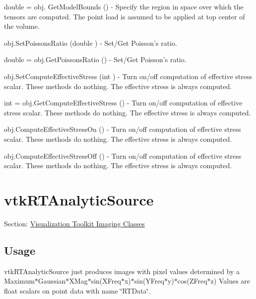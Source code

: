 \begin{DoxyItemize}
\item {\ttfamily double = obj. Get\-Model\-Bounds ()} -\/ Specify the region in space over which the tensors are computed. The point load is assumed to be applied at top center of the volume.  
\item {\ttfamily obj.\-Set\-Poissons\-Ratio (double )} -\/ Set/\-Get Poisson's ratio.  
\item {\ttfamily double = obj.\-Get\-Poissons\-Ratio ()} -\/ Set/\-Get Poisson's ratio.  
\item {\ttfamily obj.\-Set\-Compute\-Effective\-Stress (int )} -\/ Turn on/off computation of effective stress scalar. These methods do nothing. The effective stress is always computed.  
\item {\ttfamily int = obj.\-Get\-Compute\-Effective\-Stress ()} -\/ Turn on/off computation of effective stress scalar. These methods do nothing. The effective stress is always computed.  
\item {\ttfamily obj.\-Compute\-Effective\-Stress\-On ()} -\/ Turn on/off computation of effective stress scalar. These methods do nothing. The effective stress is always computed.  
\item {\ttfamily obj.\-Compute\-Effective\-Stress\-Off ()} -\/ Turn on/off computation of effective stress scalar. These methods do nothing. The effective stress is always computed.  
\end{DoxyItemize}\hypertarget{vtkimaging_vtkrtanalyticsource}{}\section{vtk\-R\-T\-Analytic\-Source}\label{vtkimaging_vtkrtanalyticsource}
Section\-: \hyperlink{sec_vtkimaging}{Visualization Toolkit Imaging Classes} \hypertarget{vtkwidgets_vtkxyplotwidget_Usage}{}\subsection{Usage}\label{vtkwidgets_vtkxyplotwidget_Usage}
vtk\-R\-T\-Analytic\-Source just produces images with pixel values determined by a Maximum$\ast$\-Gaussian$\ast$\-X\-Mag$\ast$sin(X\-Freq$\ast$x)$\ast$sin(Y\-Freq$\ast$y)$\ast$cos(Z\-Freq$\ast$z) Values are float scalars on point data with name \char`\"{}\-R\-T\-Data\char`\"{}.

